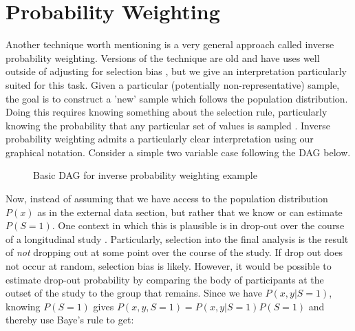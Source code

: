 \documentclass[12pt,twoside]{reedthesis}
\theoremstyle{definition}
\begin{document}
\section{Probability Weighting}

Another technique worth mentioning is a very general approach called inverse probability weighting. Versions of the technique are old  and have uses well outside of adjusting for selection bias \citep{Horvitz_1952}, but we give an interpretation particularly suited for this task. Given a particular (potentially non-representative) sample, the goal is to construct a 'new' sample which follows the population distribution. Doing this requires knowing something about the selection rule, particularly knowing the probability that any particular set of values is sampled \cite{Cortes_2008}. Inverse probability weighting admits a particularly clear interpretation using our graphical notation. Consider a simple two variable case following the DAG below.
\begin{figure}[H]
\begin{center}
\end{center}
\caption{Basic DAG for inverse probability weighting example}
\end{figure}


Now, instead of assuming that we have access to the population distribution $P(x)$ as in the external data section, but rather that we know or can estimate  $P(S = 1)$.  One context in which this is plausible is in drop-out over the course of a longitudinal study \citep{Hernan_2004}. Particularly, selection into the final analysis is the result of \emph{not} dropping out at some point over the course of the study. If drop out does not occur at random, selection bias is likely. However, it would be possible to estimate drop-out probability by comparing the body of participants at the outset of the study to the group that remains. Since we have $P(x,y | S = 1)$, knowing $P(S = 1)$ gives $P(x,y, S = 1) = P(x,y | S = 1)P(S = 1)$ and thereby use Baye's rule to get:
\end{document}
